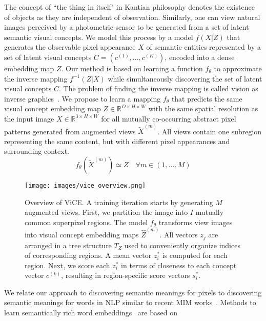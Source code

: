 \documentclass{bmvc2k}
\begin{document}
The concept of ``the thing in itself" in Kantian philosophy denotes the existence of objects as they are independent of observation. Similarly, one can view natural images perceived by a photometric sensor to be generated from a set of latent semantic visual concepts. We model this process by a model $f(X | Z)$ that generates the observable pixel appearance $X$ of semantic entities represented by a set of latent visual concepts $C = (c^{(1)}, \dots, c^{(K)})$, encoded into a dense embedding map $Z$. Our method is based on learning a function $f_\theta$ to approximate the inverse mapping $f^{-1}(Z | X)$ while simultaneously discovering the set of latent visual concepts $C$. The problem of finding the inverse mapping is called vision as inverse graphics~\cite{Kersten2004PerceptionBayesianInf, Kersten2006AnalysisSynthesis, Comellas2019VisionInvGraphics}. We propose to learn a mapping $f_\theta$ that predicts the same visual concept embedding map $Z \in \mathbb{R}^{D \times H \times W}$ with the same spatial resolution as the input image $X \in \mathbb{R}^{3 \times H \times W}$ for all mutually co-occurring abstract pixel patterns generated from augmented views $\tilde{X}^{(m)}$. All views contain one subregion representing the same content, but with different pixel appearances and surrounding context.
\begin{equation}
\label{eq:inverse_mapping}
   f_\theta ( \tilde{X}^{(m)} ) \simeq Z \quad \forall m \in (1, \dots, M)
\end{equation}
\begin{figure}
\begin{center}
\texttt{[image: images/vice\_overview.png]}
\end{center}
   \caption{Overview of ViCE. A training iteration starts by generating $M$ augmented views. First, we partition the image into $I$ mutually common superpixel regions. The model $f_\theta$ transforms view images into visual concept embedding maps $\hat{Z}^{(m)}$. All vectors $z_j$ are arranged in a tree structure $T_Z$ used to conveniently organize indices of corresponding regions. A mean vector $z^*_i$ is computed for each region. Next, we score each $z^*_i$ in terms of closeness to each concept vector $c^{(k)}$, resulting in region-specific score vectors $s^*_i$.}
\label{fig:overview}
\end{figure}
We relate our approach to discovering semantic meanings for pixels to discovering semantic meanings for words in NLP similar to recent MIM works~\cite{Bao2022BEiT, Zhou2021iBOT, Chen2022CAE, Xie2021SimMIMAS}. Methods to learn semantically rich word embeddings~\cite{Mikolov2013EffWordRep,Mikolov2013DistributedRO,Pennington2014GloVe} are based on
\end{document}
